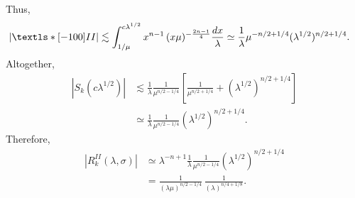 \documentclass[11pt, reqno]{amsart}
\theoremstyle{plain}
\theoremstyle{remark}
\newcommand{\ROMAN}{\textls*[-100]}
\theoremstyle{example}
\theoremstyle{definition}
\numberwithin{equation}{section}
\begin{document}
Thus, 
\begin{equation*}
   \begin{split}
        |\ROMAN{II}| 
        & \lesssim   \int_{ 1 / \mu}^{c \lambda^{1/2}}   x^{n-1} \, (x \mu )^{-\frac{2n-1}{4}} \frac{dx}{\lambda} \simeq \frac{1}{\lambda}   \mu^{-n/2+ 1/4} (\lambda^{1/2})^{n/2 + 1/4}.
   \end{split}
\end{equation*}
Altogether,
\begin{equation}\label{upto mu base}
   \begin{split}
        |S_{k}(c \lambda^{1/2})|
        & \lesssim    \frac{1}{\lambda} \frac{1}{\mu^{n/2 - 1/4}}  \left[  \frac{1}{\mu^{n/2 + 1/4}} +   (\lambda^{1/2})^{n/2 + 1/4} \right]\\
        & \simeq  \frac{1}{\lambda} \frac{1}{\mu^{n/2 - 1/4}}   (\lambda^{1/2})^{n/2 + 1/4}.
   \end{split}
\end{equation}
Therefore,
\begin{equation}\label{Case A estimate}
   \begin{split}
        | R_{k}^{II}(\lambda, \sigma)|
        & \simeq \lambda^{-n+1} \frac{1}{\lambda} \frac{1}{\mu^{n/2 - 1/4}}   (\lambda^{1/2})^{n/2 + 1/4}\\
        & = \frac{1}{(\lambda \mu)^{n/2 - 1/4}} \, \frac{1}{(\lambda )^{n/4 + 1/8}}. 
   \end{split}
\end{equation}
\end{document}

